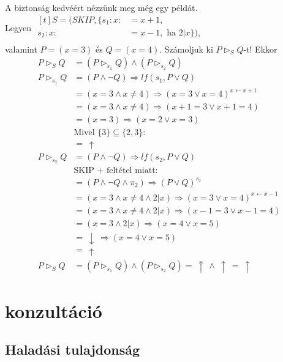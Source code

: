 \documentclass[12pt]{article}
\begin{document}
A biztonság kedvéért nézzünk meg még egy példát. \\
Legyen $\begin{aligned}[t]
	S = (SKIP, \{
		s_1: x :&= x+1, \\
		s_2: x :&= x-1, \text{ ha } 2|x \}), \\
\end{aligned}$ \\
valamint $P = (x=3)$ és $Q = (x=4)$. Számoljuk ki $P \vartriangleright_S Q$-t! Ekkor
\begin{align*}
	P \vartriangleright_S Q &= (P \vartriangleright_{s_1} Q) \land (P \vartriangleright_{s_2} Q) \\
	P \vartriangleright_{s_1} Q &= (P \land \neg Q) \Rightarrow lf(s_1, P \lor Q) \\
		&= (x = 3 \land x \neq 4) \Rightarrow (x=3 \lor x=4)^{x \leftarrow x+1} \\
		&= (x = 3 \land x \neq 4) \Rightarrow (x+1=3 \lor x+1=4) \\
		&= (x = 3) \Rightarrow (x=2 \lor x=3) \\
		&\text{Mivel } \{3\} \subseteq \{2, 3\}: \\
		&=\ \uparrow \\
	P \vartriangleright_{s_2} Q &= (P \land \neg Q) \Rightarrow lf(s_2, P \lor Q) \\
		&\text{SKIP + feltétel miatt:} \\
		&= (P \land \neg Q \land \pi_2) \Rightarrow (P \lor Q)^{s_2} \\
		&= (x=3 \land x \neq 4 \land 2|x) \Rightarrow (x=3 \lor x=4)^{x \leftarrow x-1} \\
		&= (x=3 \land x \neq 4 \land 2|x) \Rightarrow (x-1=3 \lor x-1=4) \\
		&= (x=3 \land 2|x) \Rightarrow (x=4 \lor x=5) \\
		&=\ \downarrow\ \Rightarrow (x=4 \lor x=5) \\
		&=\ \uparrow \\
	P \vartriangleright_S Q &= (P \vartriangleright_{s_1} Q) \land (P \vartriangleright_{s_2} Q) =\ \uparrow\ \land\ \uparrow\ =\ \uparrow
\end{align*}

\section{konzultáció}
\subsection{Haladási tulajdonság}
\end{document}
